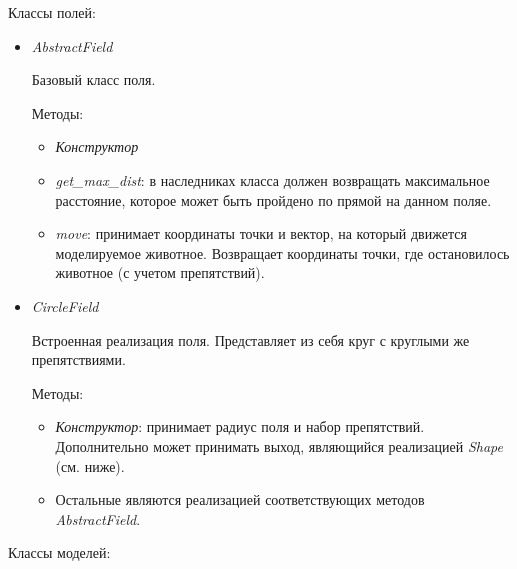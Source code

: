\documentclass{article}
\begin{document}
Классы полей:

\begin{itemize}

\item \textit{AbstractField}
    
    Базовый класс поля.

    Методы:
    \begin{itemize}
        \item \textit{Конструктор}

        \item \textit{get\_max\_dist}: в наследниках класса должен возвращать максимальное расстояние, которое
может быть пройдено по прямой на данном поляе.

        \item \textit{move}: принимает координаты точки и вектор, на который движется моделируемое
животное. Возвращает координаты точки, где остановилось животное (с учетом препятствий).

    \end{itemize}

\item \textit{CircleField}
    
    Встроенная реализация поля. Представляет из себя круг с круглыми же
препятствиями.

    Методы:
    \begin{itemize}
        \item \textit{Конструктор}: принимает радиус поля и набор препятствий. Дополнительно может принимать выход, являющийся реализацией \textit{Shape} (см. ниже).

        \item Остальные являются реализацией соответствующих методов \textit{AbstractField}.

    \end{itemize}


\end{itemize}

Классы моделей:
\end{document}
